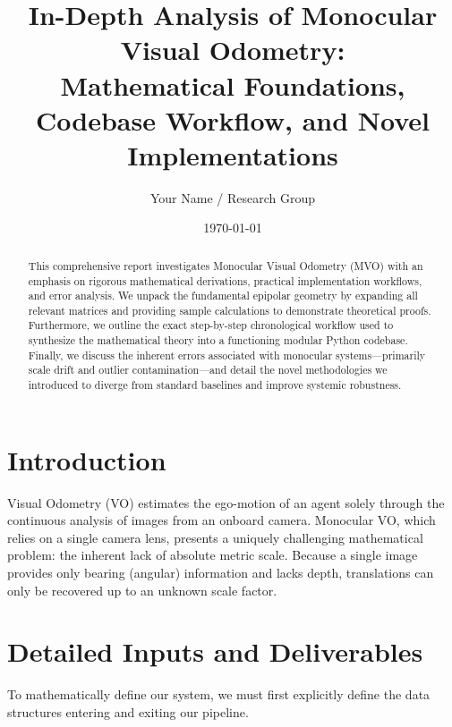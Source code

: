 \documentclass[12pt]{article}
\title{In-Depth Analysis of Monocular Visual Odometry: \\ Mathematical Foundations, Codebase Workflow, and Novel Implementations}
\author{Your Name / Research Group}
\date{\today}
\begin{document}
\maketitle

\begin{abstract}
This comprehensive report investigates Monocular Visual Odometry (MVO) with an emphasis on rigorous mathematical derivations, practical implementation workflows, and error analysis. We unpack the fundamental epipolar geometry by expanding all relevant matrices and providing sample calculations to demonstrate theoretical proofs. Furthermore, we outline the exact step-by-step chronological workflow used to synthesize the mathematical theory into a functioning modular Python codebase. Finally, we discuss the inherent errors associated with monocular systems---primarily scale drift and outlier contamination---and detail the novel methodologies we introduced to diverge from standard baselines and improve systemic robustness.
\end{abstract}

\section{Introduction}
Visual Odometry (VO) estimates the ego-motion of an agent solely through the continuous analysis of images from an onboard camera. Monocular VO, which relies on a single camera lens, presents a uniquely challenging mathematical problem: the inherent lack of absolute metric scale. Because a single image provides only bearing (angular) information and lacks depth, translations can only be recovered up to an unknown scale factor.

\section{Detailed Inputs and Deliverables}
To mathematically define our system, we must first explicitly define the data structures entering and exiting our pipeline.
\end{document}

